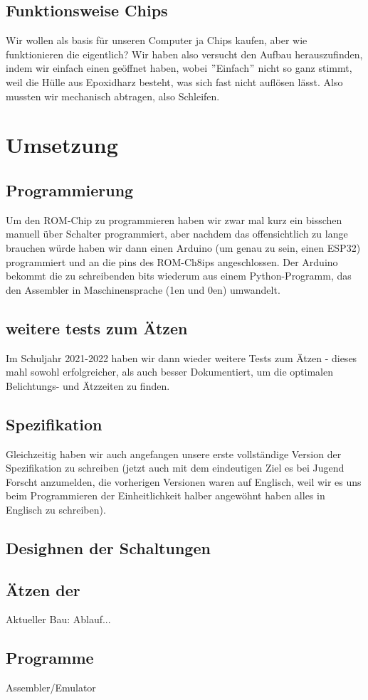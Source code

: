 \documentclass{scrartcl}
\begin{document}
    \subsection{Funktionsweise Chips}
    Wir wollen als basis für unseren Computer ja Chips kaufen, aber wie funktionieren die eigentlich?
    Wir haben also versucht den Aufbau herauszufinden, indem wir einfach einen geöffnet haben, wobei $"$Einfach$"$ nicht so ganz stimmt, weil die Hülle aus Epoxidharz besteht, was sich fast nicht auflösen lässt.
    Also mussten wir mechanisch abtragen, also Schleifen.

    \section{Umsetzung}
    \subsection{Programmierung}
    Um den ROM-Chip zu programmieren haben wir zwar mal kurz ein bisschen manuell über Schalter programmiert, aber nachdem das offensichtlich zu lange brauchen würde haben wir dann einen Arduino (um genau zu sein, einen ESP32) programmiert und an die pins des ROM-Ch8ips angeschlossen.
    Der Arduino bekommt die zu schreibenden bits wiederum aus einem Python-Programm, das den Assembler in Maschinensprache (1en und 0en) umwandelt.

    \subsection{weitere tests zum Ätzen}
    Im Schuljahr 2021-2022 haben wir dann wieder weitere Tests zum Ätzen - dieses mahl sowohl erfolgreicher, als auch besser Dokumentiert, um die optimalen Belichtungs- und Ätzzeiten zu finden.

    \subsection{Spezifikation}
    Gleichzeitig haben wir auch angefangen unsere erste vollständige Version der Spezifikation zu schreiben (jetzt auch mit dem eindeutigen Ziel es bei Jugend Forscht anzumelden, die vorherigen Versionen waren auf Englisch, weil wir es uns beim Programmieren der Einheitlichkeit halber angewöhnt haben alles in Englisch zu schreiben).

    \subsection{Desighnen der Schaltungen}

    \subsection{Ätzen der }
    Aktueller Bau: Ablauf...
    \subsection{Programme}
    Assembler/Emulator
\end{document}
